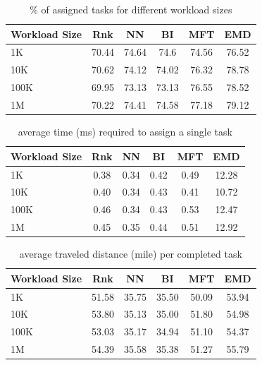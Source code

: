 \begin{table}[h]
\begin{center}
\begin{tabular}{| l || c | c | c | c | c |} \hline
Workload Size	&	Rnk		&	NN		&	BI		&	MFT		&	EMD		\\ \hline
1K				&	70.44	&	74.64	&	74.6	&	74.56	&	76.52	\\ \hline
10K				&	70.62	&	74.12	&	74.02	&	76.32	&	78.78	\\ \hline
100K			& 	69.95	&	73.13	&	73.13	&	76.55	&	78.52	\\ \hline
1M				&	70.22	&	74.41	&	74.58	&	77.18	&	79.12	\\ \hline
\end{tabular}
\vspace{-0.1in}
\caption{\small{\% of assigned tasks for different workload sizes}}
\label{tab:size_perc}
\end{center}
\end{table}
\vspace{-0.3in}
\begin{table}[h]
\begin{center}
\begin{tabular}{| l || c | c | c | c | c |} \hline
Workload Size	&	Rnk		&	NN		&	BI		&	MFT		&	EMD		\\ \hline
1K				&	0.38	&	0.34	&	0.42	&	0.49	&	12.28	\\ \hline
10K				&	0.40	&	0.34	&	0.43	&	0.41	&	10.72	\\ \hline
100K			& 	0.46	&	0.34	&	0.43	&	0.53	&	12.47	\\ \hline
1M				&	0.45	&	0.35	&	0.44	&	0.51	&	12.92	\\ \hline
\end{tabular}
\vspace{-0.1in}
\caption{\small{average time (ms) required to assign a single task}}
\label{tab:size_time}
\end{center}
\end{table}
\vspace{-0.3in}
\begin{table}[h]
\begin{center}
\begin{tabular}{| l || c | c | c | c | c |} \hline
Workload Size	&	Rnk		&	NN		&	BI		&	MFT		&	EMD		\\ \hline
1K				&	51.58	&	35.75	&	35.50	&	50.09	&	53.94	\\ \hline
10K				&	53.80	&	35.13	&	35.00	&	51.80	&	54.98	\\ \hline
100K			& 	53.03	&	35.17	&	34.94	&	51.10	&	54.37	\\ \hline
1M				&	54.39	&	35.58	&	35.38	&	51.27	&	55.79	\\ \hline
\end{tabular}
\vspace{-0.1in}
\caption{\small{average traveled distance (mile) per completed task}}
\label{tab:size_dist}
\end{center}
\end{table}

